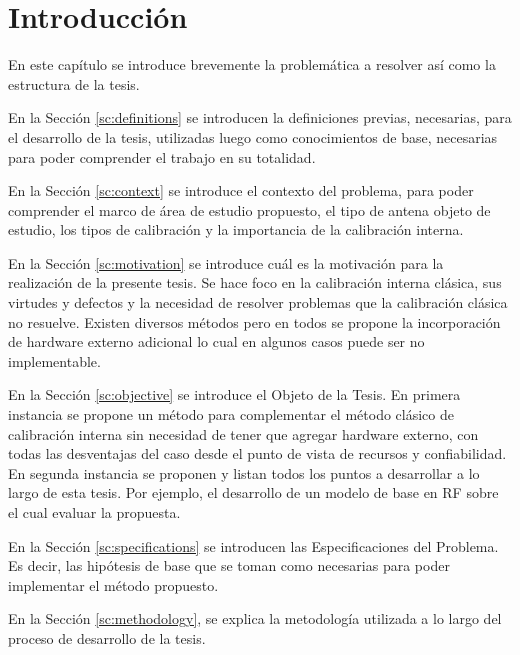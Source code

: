 
\chapter{Introducción} %

\label{ch:introduccion} %

En este capítulo se introduce brevemente la problemática a resolver así como la estructura de la tesis.

En la Sección \ref{sc:definitions} se introducen la definiciones previas, necesarias, para el desarrollo de la tesis, utilizadas
luego como conocimientos de base, necesarias para poder comprender el trabajo en su totalidad.

En la Sección \ref{sc:context} se introduce el contexto del problema, para poder comprender el marco de área de estudio
propuesto, el tipo de antena objeto de estudio, los tipos de calibración y la importancia de la calibración interna.

En la Sección \ref{sc:motivation} se introduce cuál es la motivación para la realización de la presente tesis. Se hace foco
en la calibración interna clásica, sus virtudes y defectos y la necesidad de resolver problemas que la calibración clásica no
resuelve. Existen diversos métodos pero en todos se propone la incorporación de hardware externo adicional lo cual en algunos 
casos puede ser no implementable.

En la Sección \ref{sc:objective} se introduce el Objeto de la Tesis. En primera instancia se propone un método para 
complementar el método clásico de calibración interna sin necesidad de tener que agregar hardware externo, con todas las 
desventajas del caso desde el punto de vista de recursos y confiabilidad. En segunda instancia se proponen y listan todos los 
puntos a desarrollar a lo largo de esta tesis. Por ejemplo, el desarrollo de un modelo de base en RF sobre el cual evaluar la 
propuesta.

En la Sección \ref{sc:specifications} se introducen las Especificaciones del Problema. Es decir, las hipótesis de base que se
toman como necesarias para poder implementar el método propuesto.

En la Sección \ref{sc:methodology}, se explica la metodología utilizada a lo largo del proceso de desarrollo de la tesis.

